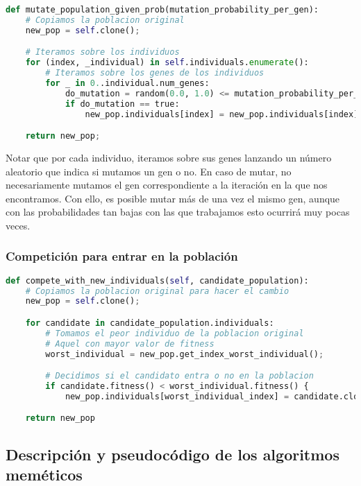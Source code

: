 \documentclass[11pt]{article}
\begin{document}
\begin{lstlisting}[language=Python, style=Boxed]
def mutate_population_given_prob(mutation_probability_per_gen):
    # Copiamos la poblacion original
    new_pop = self.clone();

    # Iteramos sobre los individuos
    for (index, _individual) in self.individuals.enumerate():
        # Iteramos sobre los genes de los individuos
        for _ in 0..individual.num_genes:
            do_mutation = random(0.0, 1.0) <= mutation_probability_per_gen;
            if do_mutation == true:
                new_pop.individuals[index] = new_pop.individuals[index].mutated();

    return new_pop;
\end{lstlisting}

Notar que por cada individuo, iteramos sobre sus genes lanzando un número aleatorio que indica si mutamos un gen o no. En caso de mutar, no necesariamente mutamos el gen correspondiente a la iteración en la que nos encontramos. Con ello, es posible mutar más de una vez el mismo gen, aunque con las probabilidades tan bajas con las que trabajamos esto ocurrirá muy pocas veces.

\subsubsection{Competición para entrar en la población}

\begin{lstlisting}[language=Python, style=Boxed]
def compete_with_new_individuals(self, candidate_population):
    # Copiamos la poblacion original para hacer el cambio
    new_pop = self.clone();

    for candidate in candidate_population.individuals:
        # Tomamos el peor individuo de la poblacion original
        # Aquel con mayor valor de fitness
        worst_individual = new_pop.get_index_worst_individual();

        # Decidimos si el candidato entra o no en la poblacion
        if candidate.fitness() < worst_individual.fitness() {
            new_pop.individuals[worst_individual_index] = candidate.clone();

    return new_pop
\end{lstlisting}



\pagebreak
\subsection{Descripción y pseudocódigo de los algoritmos meméticos}
\pagebreak
\end{document}
